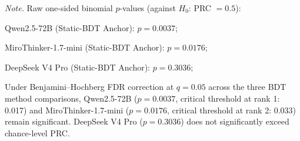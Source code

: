 
\emph{Note.} Raw one-sided binomial $p$-values (against $H_0$: PRC $= 0.5$):

Qwen2.5-72B (Static-BDT Anchor): $p = 0.0037$;

MiroThinker-1.7-mini (Static-BDT Anchor): $p = 0.0176$;

DeepSeek V4 Pro (Static-BDT Anchor): $p = 0.3036$;

Under Benjamini--Hochberg FDR correction at $q = 0.05$ across the three BDT method comparisons, Qwen2.5-72B ($p = 0.0037$, critical threshold at rank 1: 0.017) and MiroThinker-1.7-mini ($p = 0.0176$, critical threshold at rank 2: 0.033) remain significant. DeepSeek V4 Pro ($p = 0.3036$) does not significantly exceed chance-level PRC.
